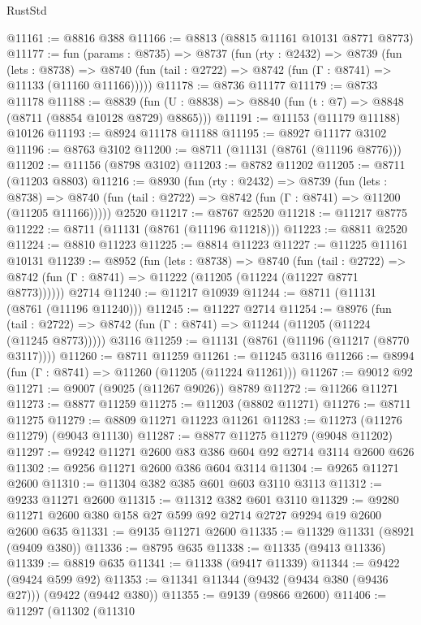 \begin{lexlean}{RustStd}
\begin{coremodule}
@11161 := @8816 @388
@11166 := @8813 (@8815 @11161 @10131 @8771 @8773)
@11177 := fun (params : @8735) =>
  @8737
    (fun (rty : @2432) =>
    @8739
      (fun (lets : @8738) =>
      @8740 (fun (tail : @2722) => @8742 (fun (Γ : @8741) => @11133 (@11160 @11166)))))
@11178 := @8736 @11177
@11179 := @8733 @11178
@11188 := @8839
    (fun (U : @8838) => @8840 (fun (t : @7) => @8848 (@8711 (@8854 @10128 @8729) @8865)))
@11191 := @11153 (@11179 @11188) @10126
@11193 := @8924 @11178 @11188
@11195 := @8927 @11177 @3102
@11196 := @8763 @3102
@11200 := @8711 (@11131 (@8761 (@11196 @8776)))
@11202 := @11156 (@8798 @3102)
@11203 := @8782 @11202
@11205 := @8711 (@11203 @8803)
@11216 := @8930
    (fun (rty : @2432) =>
    @8739
      (fun (lets : @8738) =>
      @8740 (fun (tail : @2722) => @8742 (fun (Γ : @8741) => @11200 (@11205 @11166)))))
    @2520
@11217 := @8767 @2520
@11218 := @11217 @8775
@11222 := @8711 (@11131 (@8761 (@11196 @11218)))
@11223 := @8811 @2520
@11224 := @8810 @11223
@11225 := @8814 @11223
@11227 := @11225 @11161 @10131
@11239 := @8952
    (fun (lets : @8738) =>
    @8740
      (fun (tail : @2722) =>
      @8742 (fun (Γ : @8741) => @11222 (@11205 (@11224 (@11227 @8771 @8773))))))
    @2714
@11240 := @11217 @10939
@11244 := @8711 (@11131 (@8761 (@11196 @11240)))
@11245 := @11227 @2714
@11254 := @8976
    (fun (tail : @2722) => @8742 (fun (Γ : @8741) => @11244 (@11205 (@11224 (@11245 @8773)))))
    @3116
@11259 := @11131 (@8761 (@11196 (@11217 (@8770 @3117))))
@11260 := @8711 @11259
@11261 := @11245 @3116
@11266 := @8994 (fun (Γ : @8741) => @11260 (@11205 (@11224 @11261)))
@11267 := @9012 @92
@11271 := @9007 (@9025 (@11267 @9026)) @8789
@11272 := @11266 @11271
@11273 := @8877 @11259
@11275 := @11203 (@8802 @11271)
@11276 := @8711 @11275
@11279 := @8809 @11271 @11223 @11261
@11283 := @11273 (@11276 @11279) (@9043 @11130)
@11287 := @8877 @11275 @11279 (@9048 @11202)
@11297 := @9242 @11271 @2600 @83 @386 @604 @92 @2714 @3114 @2600 @626
@11302 := @9256 @11271 @2600 @386 @604 @3114
@11304 := @9265 @11271 @2600
@11310 := @11304 @382 @385 @601 @603 @3110 @3113
@11312 := @9233 @11271 @2600
@11315 := @11312 @382 @601 @3110
@11329 := @9280 @11271 @2600 @380 @158 @27 @599 @92 @2714 @2727 @9294 @19 @2600 @2600 @635
@11331 := @9135 @11271 @2600
@11335 := @11329 @11331 (@8921 (@9409 @380))
@11336 := @8795 @635
@11338 := @11335 (@9413 @11336)
@11339 := @8819 @635
@11341 := @11338 (@9417 @11339)
@11344 := @9422 (@9424 @599 @92)
@11353 := @11341 @11344 (@9432 (@9434 @380 (@9436 @27))) (@9422 (@9442 @380))
@11355 := @9139 (@9866 @2600)
@11406 := @11297
    (@11302
      (@11310

\end{coremodule}
\end{lexlean}
